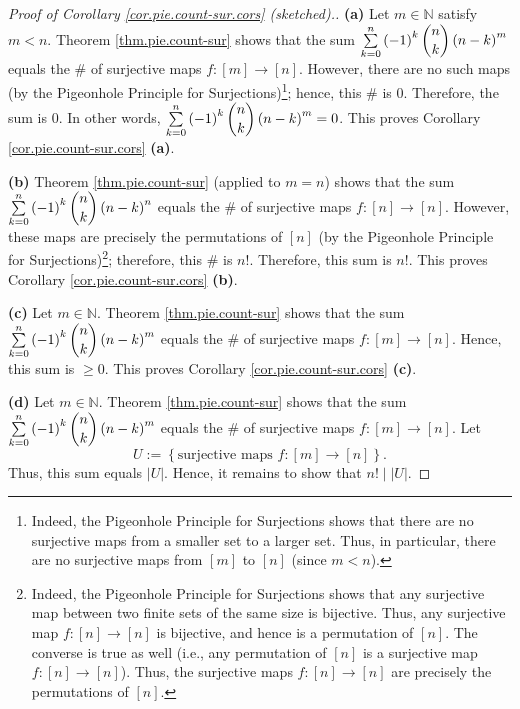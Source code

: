 \begin{proof}
[Proof of Corollary \ref{cor.pie.count-sur.cors} (sketched).]\textbf{(a)} Let
$m\in\mathbb{N}$ satisfy $m<n$. Theorem \ref{thm.pie.count-sur} shows that the
sum $\sum\limits_{k=0}^{n}\left(  -1\right)  ^{k}\dbinom{n}{k}\left(
n-k\right)  ^{m}$ equals the \# of surjective maps $f:\left[  m\right]
\rightarrow\left[  n\right]  $. However, there are no such maps (by the
Pigeonhole Principle for Surjections)\footnote{Indeed, the Pigeonhole
Principle for Surjections shows that there are no surjective maps from a
smaller set to a larger set. Thus, in particular, there are no surjective maps
from $\left[  m\right]  $ to $\left[  n\right]  $ (since $m<n$).}; hence, this
\# is $0$. Therefore, the sum is $0$. In other words, $\sum\limits_{k=0}%
^{n}\left(  -1\right)  ^{k}\dbinom{n}{k}\left(  n-k\right)  ^{m}=0$. This
proves Corollary \ref{cor.pie.count-sur.cors} \textbf{(a)}. \medskip

\textbf{(b)} Theorem \ref{thm.pie.count-sur} (applied to $m=n$) shows that the
sum $\sum\limits_{k=0}^{n}\left(  -1\right)  ^{k}\dbinom{n}{k}\left(
n-k\right)  ^{n}$ equals the \# of surjective maps $f:\left[  n\right]
\rightarrow\left[  n\right]  $. However, these maps are precisely the
permutations of $\left[  n\right]  $ (by the Pigeonhole Principle for
Surjections)\footnote{Indeed, the Pigeonhole Principle for Surjections shows
that any surjective map between two finite sets of the same size is bijective.
Thus, any surjective map $f:\left[  n\right]  \rightarrow\left[  n\right]  $
is bijective, and hence is a permutation of $\left[  n\right]  $. The converse
is true as well (i.e., any permutation of $\left[  n\right]  $ is a surjective
map $f:\left[  n\right]  \rightarrow\left[  n\right]  $). Thus, the surjective
maps $f:\left[  n\right]  \rightarrow\left[  n\right]  $ are precisely the
permutations of $\left[  n\right]  $.}; therefore, this \# is $n!$. Therefore,
this sum is $n!$. This proves Corollary \ref{cor.pie.count-sur.cors}
\textbf{(b)}. \medskip

\textbf{(c)} Let $m\in\mathbb{N}$. Theorem \ref{thm.pie.count-sur} shows that
the sum $\sum\limits_{k=0}^{n}\left(  -1\right)  ^{k}\dbinom{n}{k}\left(
n-k\right)  ^{m}$ equals the \# of surjective maps $f:\left[  m\right]
\rightarrow\left[  n\right]  $. Hence, this sum is $\geq0$. This proves
Corollary \ref{cor.pie.count-sur.cors} \textbf{(c)}. \medskip

\textbf{(d)} Let $m\in\mathbb{N}$. Theorem \ref{thm.pie.count-sur} shows that
the sum $\sum\limits_{k=0}^{n}\left(  -1\right)  ^{k}\dbinom{n}{k}\left(
n-k\right)  ^{m}$ equals the \# of surjective maps $f:\left[  m\right]
\rightarrow\left[  n\right]  $. Let
\[
U:=\left\{  \text{surjective maps }f:\left[  m\right]  \rightarrow\left[
n\right]  \right\}  .
\]
Thus, this sum equals $\left\vert U\right\vert $. Hence, it remains to show
that $n!\mid\left\vert U\right\vert $.


\end{proof}
